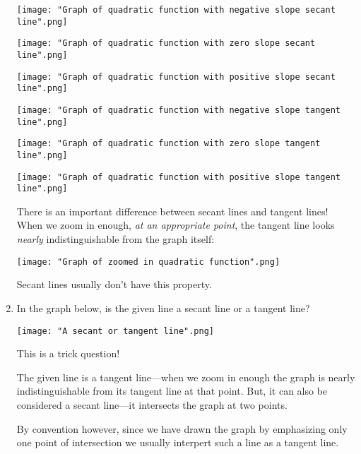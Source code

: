 \documentclass[nooutcomes]{ximera}
\begin{document}
\begin{problem}
\begin{enumerate}
\begin{freeResponse} \hfil
	\begin{image}
           \texttt{[image: "Graph of quadratic function with negative slope secant line".png]}
         \end{image}
         \begin{image}
           \texttt{[image: "Graph of quadratic function with zero slope secant line".png]}
         \end{image}
         \begin{image}
           \texttt{[image: "Graph of quadratic function with positive slope secant line".png]}
         \end{image}
          \begin{image}
            \texttt{[image: "Graph of quadratic function with negative slope tangent line".png]}
          \end{image}
          \begin{image}
            \texttt{[image: "Graph of quadratic function with zero slope tangent line".png]}
          \end{image}
          \begin{image}
            \texttt{[image: "Graph of quadratic function with positive slope tangent line".png]}
          \end{image}
          There is an important difference between secant lines and tangent lines!
          When we zoom in enough, \emph{at an appropriate point}, the tangent line looks \emph{nearly} indistinguishable from the graph itself:
          \begin{image}
            \texttt{[image: "Graph of zoomed in quadratic function".png]}
          \end{image}
          Secant lines usually don't have this property.
	\end{freeResponse}

		\item In the graph below, is the given line a secant line or a tangent line?
		\begin{image}
		 \texttt{[image: "A secant or tangent line".png]}
		\end{image}

	\begin{freeResponse}
	This is a trick question!

        The given line is a tangent line---when we zoom in enough the graph is nearly indistinguishable from its tangent line at that point.
        But, it can also be considered a secant line---it intersects the graph at two points.

        By convention however, since we have drawn the graph by emphasizing only one point of intersection we usually interpert such a line as a tangent line.
	      \end{freeResponse}
	\end{enumerate}

\end{problem}
\end{document}
